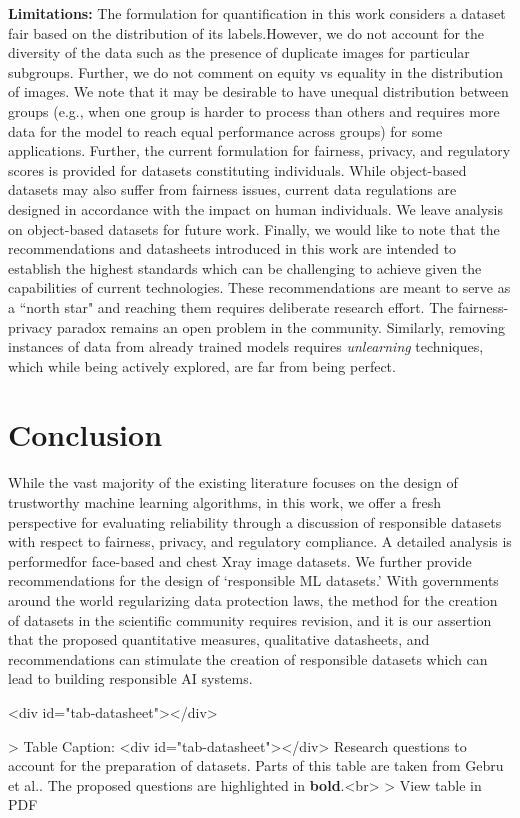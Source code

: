 \documentclass[journal]{IEEEtran}
\begin{document}
\noindent \textbf{Limitations:} The formulation for quantification in this work considers a dataset fair based on the distribution of its labels.However, we do not account for the diversity of the data such as the presence of duplicate images for particular subgroups. Further, we do not comment on equity vs equality in the distribution of images. We note that it may be desirable to have unequal distribution between groups (e.g., when one group is harder to process than others and requires more data for the model to reach equal performance across groups) for some applications. Further, the current formulation for fairness, privacy, and regulatory scores is provided for datasets constituting individuals. While object-based datasets may also suffer from fairness issues, current data regulations are designed in accordance with the impact on human individuals. We leave analysis on object-based datasets for future work. Finally, we would like to note that the recommendations and datasheets introduced in this work are intended to establish the highest standards which can be challenging to achieve given the capabilities of current technologies. These recommendations are meant to serve as a ``north star" and reaching them requires deliberate research effort. The fairness-privacy paradox remains an open problem in the community. Similarly, removing instances of data from already trained models requires \textit{unlearning} techniques, which while being actively explored, are far from being perfect.

\section{Conclusion}

While the vast majority of the existing literature focuses on the design of trustworthy machine learning algorithms, in this work, we offer a fresh perspective for evaluating reliability through a discussion of responsible datasets with respect to fairness, privacy, and regulatory compliance. A detailed analysis is performedfor face-based and chest Xray image datasets. We further provide recommendations for the design of `responsible ML datasets.' With governments around the world regularizing data protection laws, the method for the creation of datasets in the scientific community requires revision, and it is our assertion that the proposed quantitative measures, qualitative datasheets, and recommendations can stimulate the creation of responsible datasets which can lead to building responsible AI systems.
\begin{table}<div id="tab-datasheet"></div>

> Table Caption: <div id="tab-datasheet"></div>
 Research questions to account for the preparation of datasets. Parts of this table are taken from Gebru et al.\cite{gebru2021datasheets}. The proposed questions are highlighted in \textbf{bold}.<br>
> View table in PDF
\end{table}
\end{document}
